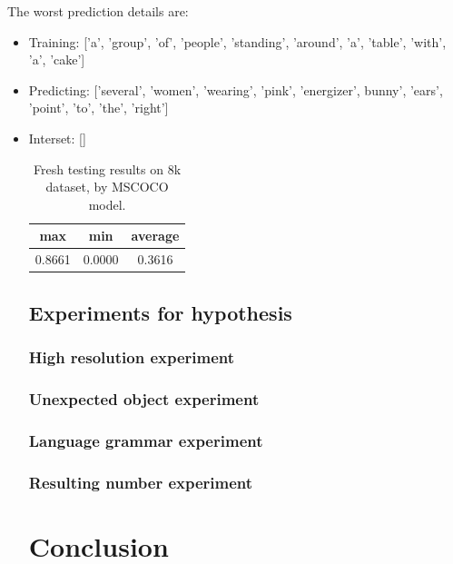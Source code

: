 \documentclass[10pt,twocolumn,letterpaper]{article}
\begin{document}
The worst prediction details are:
\begin{itemize}
    \item Training: ['a', 'group', 'of', 'people', 'standing', 'around', 'a', 'table', 'with', 'a', 'cake']
    \item Predicting: ['several', 'women', 'wearing', 'pink', 'energizer', bunny', 'ears', 'point', 'to', 'the', 'right']
    \item Interset: []

\begin{table}[]
\centering
\begin{tabular}{ccc}
\hline
max    & min    & average \\ \hline
0.8661 & 0.0000 & 0.3616  \\ \hline
\end{tabular}
\caption{Fresh testing results on 8k dataset, by MSCOCO model.}
\label{tab:fresh2}
\end{table}


\subsection{Experiments for hypothesis}
\subsubsection{High resolution experiment} \label{sec:hs}

\subsubsection{Unexpected object experiment} \label{sec:uo}

\subsubsection{Language grammar experiment} \label{sec:lg}


\subsubsection{Resulting number experiment} \label{sec:rn}


\section{Conclusion}



\end{itemize}
\end{document}
